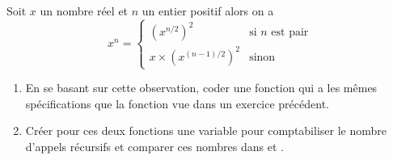 \documentclass[a4paper,12pt,french]{article}
\begin{document}
\begin{exercice}
	Soit $x$ un nombre réel et $n$ un entier positif alors on a \\
		$$x^n=\begin{cases}
	(x^{n/2})^2 & \mbox{si } n \mbox{ est pair}\\
	x\times(x^{(n-1)/2})^2 &\mbox{sinon}
	\end{cases}$$
	\begin{enumerate}[\bfseries 1.]
		\item 	En se basant sur cette observation, coder une fonction  qui a les mêmes spécifications que la fonction  vue dans un exercice précédent.
		\item 	Créer pour ces deux fonctions une variable  pour comptabiliser le nombre d'appels récursifs et comparer ces nombres dans  et .
	\end{enumerate}
\end{exercice}
\end{document}
